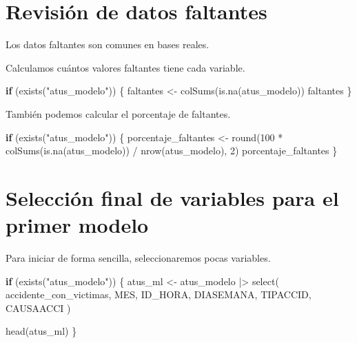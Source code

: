 \documentclass[
  11pt,
  letterpaper,
]{book}
\newenvironment{Shaded}{\begin{snugshade}}{\end{snugshade}}
\newcommand{\ControlFlowTok}[1]{\textcolor[rgb]{0.00,0.23,0.31}{\textbf{#1}}}
\newcommand{\DecValTok}[1]{\textcolor[rgb]{0.68,0.00,0.00}{#1}}
\newcommand{\FunctionTok}[1]{\textcolor[rgb]{0.28,0.35,0.67}{#1}}
\newcommand{\NormalTok}[1]{\textcolor[rgb]{0.00,0.23,0.31}{#1}}
\newcommand{\OtherTok}[1]{\textcolor[rgb]{0.00,0.23,0.31}{#1}}
\newcommand{\SpecialCharTok}[1]{\textcolor[rgb]{0.37,0.37,0.37}{#1}}
\newcommand{\StringTok}[1]{\textcolor[rgb]{0.13,0.47,0.30}{#1}}
\begin{document}
\section{Revisión de datos
faltantes}\label{revisiuxf3n-de-datos-faltantes}

Los datos faltantes son comunes en bases reales.

Calculamos cuántos valores faltantes tiene cada variable.

\begin{Shaded}
\begin{Highlighting}[]
\ControlFlowTok{if}\NormalTok{ (}\FunctionTok{exists}\NormalTok{(}\StringTok{"atus\_modelo"}\NormalTok{)) \{}
\NormalTok{  faltantes }\OtherTok{\textless{}{-}} \FunctionTok{colSums}\NormalTok{(}\FunctionTok{is.na}\NormalTok{(atus\_modelo))}
\NormalTok{  faltantes}
\NormalTok{\}}
\end{Highlighting}
\end{Shaded}

También podemos calcular el porcentaje de faltantes.

\begin{Shaded}
\begin{Highlighting}[]
\ControlFlowTok{if}\NormalTok{ (}\FunctionTok{exists}\NormalTok{(}\StringTok{"atus\_modelo"}\NormalTok{)) \{}
\NormalTok{  porcentaje\_faltantes }\OtherTok{\textless{}{-}} \FunctionTok{round}\NormalTok{(}\DecValTok{100} \SpecialCharTok{*} \FunctionTok{colSums}\NormalTok{(}\FunctionTok{is.na}\NormalTok{(atus\_modelo)) }\SpecialCharTok{/} \FunctionTok{nrow}\NormalTok{(atus\_modelo), }\DecValTok{2}\NormalTok{)}
\NormalTok{  porcentaje\_faltantes}
\NormalTok{\}}
\end{Highlighting}
\end{Shaded}

\section{Selección final de variables para el primer
modelo}\label{selecciuxf3n-final-de-variables-para-el-primer-modelo}

Para iniciar de forma sencilla, seleccionaremos pocas variables.

\begin{Shaded}
\begin{Highlighting}[]
\ControlFlowTok{if}\NormalTok{ (}\FunctionTok{exists}\NormalTok{(}\StringTok{"atus\_modelo"}\NormalTok{)) \{}
\NormalTok{  atus\_ml }\OtherTok{\textless{}{-}}\NormalTok{ atus\_modelo }\SpecialCharTok{|\textgreater{}}
    \FunctionTok{select}\NormalTok{(}
\NormalTok{      accidente\_con\_victimas,}
\NormalTok{      MES,}
\NormalTok{      ID\_HORA,}
\NormalTok{      DIASEMANA,}
\NormalTok{      TIPACCID,}
\NormalTok{      CAUSAACCI}
\NormalTok{    )}

  \FunctionTok{head}\NormalTok{(atus\_ml)}
\NormalTok{\}}
\end{Highlighting}
\end{Shaded}
\end{document}
